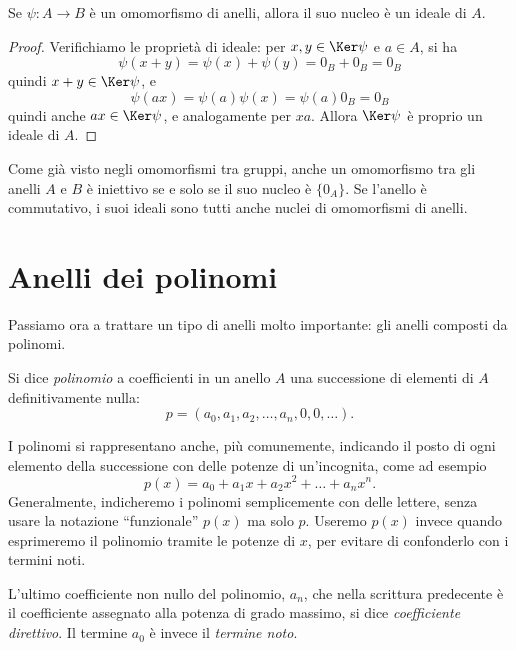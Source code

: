 \begin{teorema} \label{t:nucleo-ideale}
	Se $\psi\colon A\to B$ è un omomorfismo di anelli, allora il suo nucleo è un ideale di $A$.
\end{teorema}
\begin{proof}
	Verifichiamo le proprietà di ideale: per $x,y\in\Ker\psi$ e $a\in A$, si ha
	\begin{equation}
		\psi(x+y)=\psi(x)+\psi(y)=0_B+0_B=0_B
	\end{equation}
	quindi $x+y\in\Ker\psi$, e
	\begin{equation}
		\psi(ax)=\psi(a)\psi(x)=\psi(a)0_B=0_B
	\end{equation}
	quindi anche $ax\in\Ker\psi$, e analogamente per $xa$.
	Allora $\Ker\psi$ è proprio un ideale di $A$.
\end{proof}
Come già visto negli omomorfismi tra gruppi, anche un omomorfismo tra gli anelli $A$ e $B$ è iniettivo se e solo se il suo nucleo è $\{0_A\}$.
Se l'anello è commutativo, i suoi ideali sono tutti anche nuclei di omomorfismi di anelli.

\section{Anelli dei polinomi}
Passiamo ora a trattare un tipo di anelli molto importante: gli anelli composti da polinomi.
\begin{definizione} \label{d:polinomio}
	Si dice \emph{polinomio} a coefficienti in un anello $A$ una successione di elementi di $A$ definitivamente nulla:
	\begin{equation*}
		p=(a_0,a_1,a_2,\dots,a_n,0,0,\dots).
	\end{equation*}
\end{definizione}
I polinomi si rappresentano anche, più comunemente, indicando il posto di ogni elemento della successione con delle potenze di un'incognita, come ad esempio
\begin{equation}
	p(x)=a_0+a_1x+a_2x^2+\dots+a_nx^n.
\end{equation}
Generalmente, indicheremo i polinomi semplicemente con delle lettere, senza usare la notazione ``funzionale'' $p(x)$ ma solo $p$.
Useremo $p(x)$ invece quando esprimeremo il polinomio tramite le potenze di $x$, per evitare di confonderlo con i termini noti.

L'ultimo coefficiente non nullo del polinomio, $a_n$, che nella scrittura predecente è il coefficiente assegnato alla potenza di grado massimo, si dice \emph{coefficiente direttivo}.
Il termine $a_0$ è invece il \emph{termine noto}.

